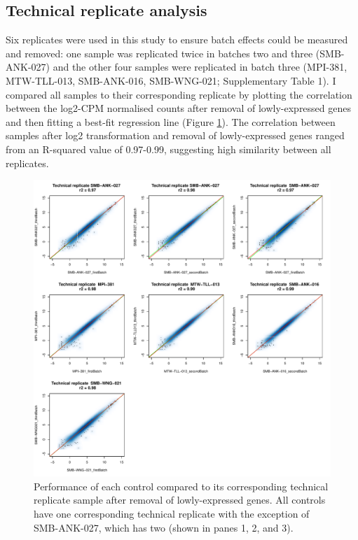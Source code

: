 \documentclass[12pt,a4paper,titlepage,twoside,openright]{book}
\begin{document}
\begin{mainmatter}
\section{Technical replicate analysis}
Six replicates were used in this study to ensure batch effects could be measured and removed: one sample was replicated twice in batches two and three (SMB-ANK-027) and the other four samples were replicated in batch three (MPI-381, MTW-TLL-013, SMB-ANK-016, SMB-WNG-021; Supplementary Table 1). I compared all samples to their corresponding replicate by plotting the correlation between the log2-CPM normalised counts after removal of lowly-expressed genes and then fitting a best-fit regression line (Figure \ref{fig:Replicate Comparisons}). The correlation between samples after log2 transformation and removal of lowly-expressed genes ranged from an R-squared value of 0.97-0.99, suggesting high similarity between all replicates.
\begin{figure}[h!]
\centering
\includegraphics[width=\textwidth,height=\textheight,keepaspectratio]{replicate_comparisons_postFiltering_123Combined.pdf}
\caption{Performance of each control compared to its corresponding technical replicate sample after removal of lowly-expressed genes. All controls have one corresponding technical replicate with the exception of SMB-ANK-027, which has two (shown in panes 1, 2, and 3).}
\label{fig:Replicate Comparisons}
\end{figure}


\end{mainmatter}
\end{document}
